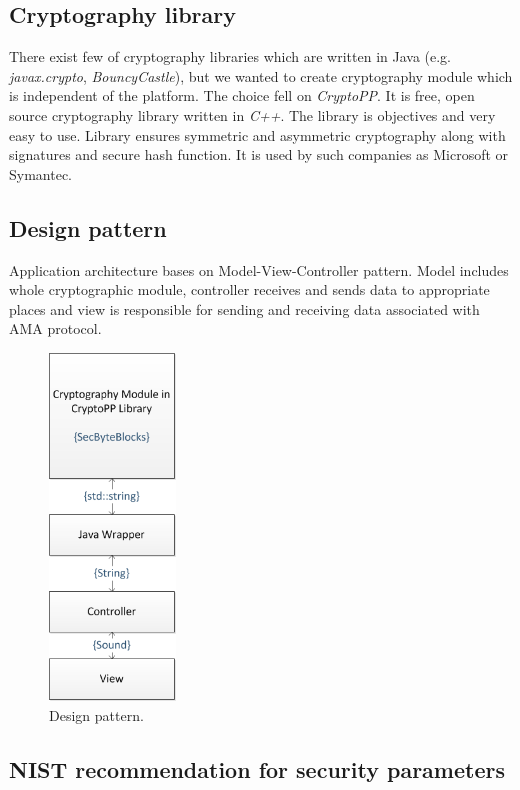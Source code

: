 \documentclass[11pt,titlepage]{article}
\theoremstyle{plain}
\begin{document}
\subsection{Cryptography library}

There exist few of cryptography libraries which are written in Java (e.g. \textit{javax.crypto}, \textit{BouncyCastle}), but we wanted to create cryptography module which is independent of the platform. The choice fell on \textit{CryptoPP}. It is free, open source cryptography library written in \textit{C++}. The library is objectives and very easy to use. Library ensures symmetric and asymmetric cryptography along with signatures and secure hash function. It is used by such companies as Microsoft or Symantec.

\subsection{Design pattern}

Application architecture bases on Model-View-Controller pattern. Model includes whole cryptographic module, controller receives and sends data to appropriate places and view is responsible for sending and receiving data associated with AMA protocol. 

\begin{figure}[H]
	\centering
	\includegraphics[width=0.3\textwidth]{img/Design}
	\caption{Design pattern.}
\end{figure}

\subsection{NIST recommendation for security parameters}
\end{document}
